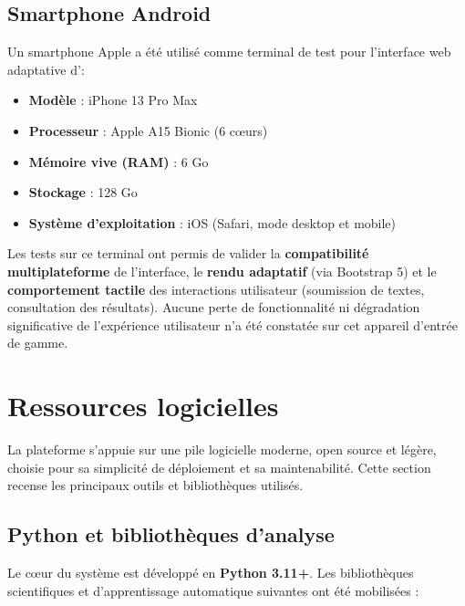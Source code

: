 \subsection{Smartphone Android}

Un smartphone Apple a été utilisé comme terminal de test pour l'interface web adaptative d'\AZIZA :

\begin{itemize}
    \item \textbf{Modèle} : iPhone 13 Pro Max
    \item \textbf{Processeur} : Apple A15 Bionic (6 cœurs)
    \item \textbf{Mémoire vive (RAM)} : 6 Go
    \item \textbf{Stockage} : 128 Go
    \item \textbf{Système d'exploitation} : iOS (Safari, mode desktop et mobile)
\end{itemize}

Les tests sur ce terminal ont permis de valider la \textbf{compatibilité multiplateforme} de l'interface, le \textbf{rendu adaptatif} (via Bootstrap 5) et le \textbf{comportement tactile} des interactions utilisateur (soumission de textes, consultation des résultats). Aucune perte de fonctionnalité ni dégradation significative de l'expérience utilisateur n'a été constatée sur cet appareil d'entrée de gamme.

\section{Ressources logicielles}

La plateforme \AZIZA{} s'appuie sur une pile logicielle moderne, open source et légère, choisie pour sa simplicité de déploiement et sa maintenabilité. Cette section recense les principaux outils et bibliothèques utilisés.

\subsection{Python et bibliothèques d'analyse}

Le cœur du système est développé en \textbf{Python 3.11+}. Les bibliothèques scientifiques et d'apprentissage automatique suivantes ont été mobilisées :

